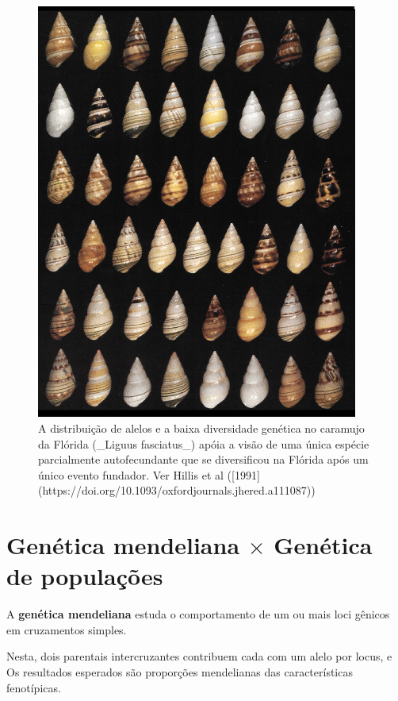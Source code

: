 \documentclass[
]{book}
\begin{document}
\begin{figure}

{\centering \includegraphics[width=400px]{figs/Liguus_fasciatus_Hillis} 

}

\caption{A distribuição de alelos e a baixa diversidade genética no caramujo da Flórida (_Liguus fasciatus_) apóia a visão de uma única espécie parcialmente autofecundante que se diversificou na Flórida após um único evento fundador. Ver Hillis et al ([1991](https://doi.org/10.1093/oxfordjournals.jhered.a111087))}\label{fig:liguus}
\end{figure}

\hypertarget{genuxe9tica-mendeliana-times-genuxe9tica-de-populauxe7uxf5es}{%
\section{\texorpdfstring{Genética mendeliana \(\times\) Genética de populações}{Genética mendeliana \textbackslash times Genética de populações}}\label{genuxe9tica-mendeliana-times-genuxe9tica-de-populauxe7uxf5es}}

A \textbf{genética mendeliana} estuda o comportamento de um ou mais loci gênicos em cruzamentos simples.

Nesta, dois parentais intercruzantes contribuem cada com um alelo por locus, e Os resultados esperados são proporções mendelianas das características fenotípicas.
\end{document}
